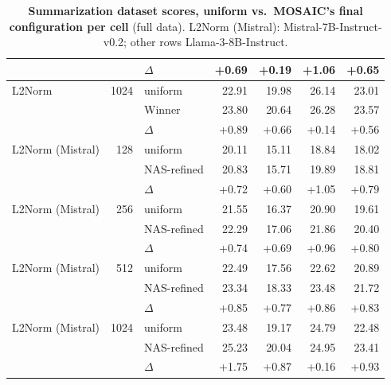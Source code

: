 \begin{table}[tp]
\begin{tabular}{@{}l r l r r r r @{}}
     &  & $\Delta$ & +0.69 & +0.19 & +1.06 & +0.65 \\
    \midrule
    L2Norm & 1024 & uniform & 22.91 & 19.98 & 26.14 & 23.01 \\
     &  & Winner & 23.80 & 20.64 & 26.28 & 23.57 \\
     &  & $\Delta$ & +0.89 & +0.66 & +0.14 & +0.56 \\
    \midrule
    L2Norm (Mistral) & 128 & uniform & 20.11 & 15.11 & 18.84 & 18.02 \\
     &  & NAS-refined & 20.83 & 15.71 & 19.89 & 18.81 \\
     &  & $\Delta$ & +0.72 & +0.60 & +1.05 & +0.79 \\
    \midrule
    L2Norm (Mistral) & 256 & uniform & 21.55 & 16.37 & 20.90 & 19.61 \\
     &  & NAS-refined & 22.29 & 17.06 & 21.86 & 20.40 \\
     &  & $\Delta$ & +0.74 & +0.69 & +0.96 & +0.80 \\
    \midrule
    L2Norm (Mistral) & 512 & uniform & 22.49 & 17.56 & 22.62 & 20.89 \\
     &  & NAS-refined & 23.34 & 18.33 & 23.48 & 21.72 \\
     &  & $\Delta$ & +0.85 & +0.77 & +0.86 & +0.83 \\
    \midrule
    L2Norm (Mistral) & 1024 & uniform & 23.48 & 19.17 & 24.79 & 22.48 \\
     &  & NAS-refined & 25.23 & 20.04 & 24.95 & 23.41 \\
     &  & $\Delta$ & +1.75 & +0.87 & +0.16 & +0.93 \\
    \bottomrule
  \end{tabular}
  \caption{\textbf{Summarization dataset scores, uniform vs.\ MOSAIC's final configuration per cell} (full data). L2Norm (Mistral): Mistral-7B-Instruct-v0.2; other rows Llama-3-8B-Instruct.}
  \label{tab:app-lb-SUMMARIZATION}
\end{table}

